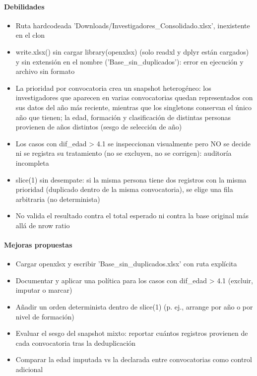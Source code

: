\paragraph{Debilidades}
\begin{itemize}
  \item Ruta hardcodeada 'Downloads/Investigadores\_Consolidado.xlsx', inexistente en el clon
  \item write.xlsx() sin cargar library(openxlsx) (solo readxl y dplyr están cargados) y sin extensión en el nombre ('Base\_sin\_duplicados'): error en ejecución y archivo sin formato
  \item La prioridad por convocatoria crea un snapshot heterogéneo: los investigadores que aparecen en varias convocatorias quedan representados con sus datos del año más reciente, mientras que los singletons conservan el único año que tienen; la edad, formación y clasificación de distintas personas provienen de años distintos (sesgo de selección de año)
  \item Los casos con dif\_edad > 4.1 se inspeccionan visualmente pero NO se decide ni se registra su tratamiento (no se excluyen, no se corrigen): auditoría incompleta
  \item slice(1) sin desempate: si la misma persona tiene dos registros con la misma prioridad (duplicado dentro de la misma convocatoria), se elige una fila arbitraria (no determinista)
  \item No valida el resultado contra el total esperado ni contra la base original más allá de nrow ratio
\end{itemize}

\paragraph{Mejoras propuestas}
\begin{itemize}
  \item Cargar openxlsx y escribir 'Base\_sin\_duplicados.xlsx' con ruta explícita
  \item Documentar y aplicar una política para los casos con dif\_edad > 4.1 (excluir, imputar o marcar)
  \item Añadir un orden determinista dentro de slice(1) (p. ej., arrange por año o por nivel de formación)
  \item Evaluar el sesgo del snapshot mixto: reportar cuántos registros provienen de cada convocatoria tras la deduplicación
  \item Comparar la edad imputada vs la declarada entre convocatorias como control adicional
\end{itemize}

